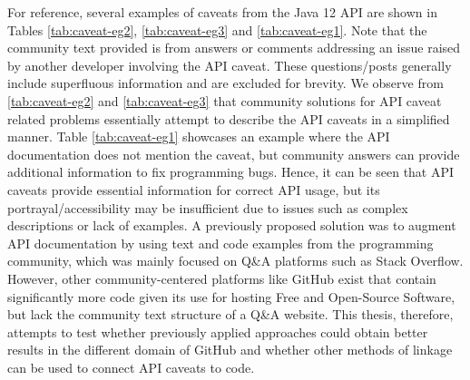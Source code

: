 For reference, several examples of caveats from the Java 12 API are shown in Tables \ref{tab:caveat-eg2}, \ref{tab:caveat-eg3} and \ref{tab:caveat-eg1}. Note that the community text provided is from answers or comments addressing an issue raised by another developer involving the API caveat. These questions/posts generally include superfluous information and are excluded for brevity. We observe from \ref{tab:caveat-eg2} and \ref{tab:caveat-eg3} that community solutions for API caveat related problems essentially attempt to describe the API caveats in a simplified manner. Table \ref{tab:caveat-eg1} showcases an example where the API documentation does not mention the caveat, but community answers can provide additional information to fix programming bugs. Hence, it can be seen that API caveats provide essential information for correct API usage, but its portrayal/accessibility may be insufficient due to issues such as complex descriptions or lack of examples. A previously proposed solution was to augment API documentation by using text and code examples from the programming community, which was mainly focused on Q\&A platforms such as Stack Overflow.  However, other community-centered platforms like GitHub exist that contain significantly more code given its use for hosting Free and Open-Source Software, but lack the community text structure of a Q\&A website. This thesis, therefore, attempts to test whether previously applied approaches could obtain better results in the different domain of GitHub and whether other methods of linkage can be used to connect API caveats to code.
\clearpage
